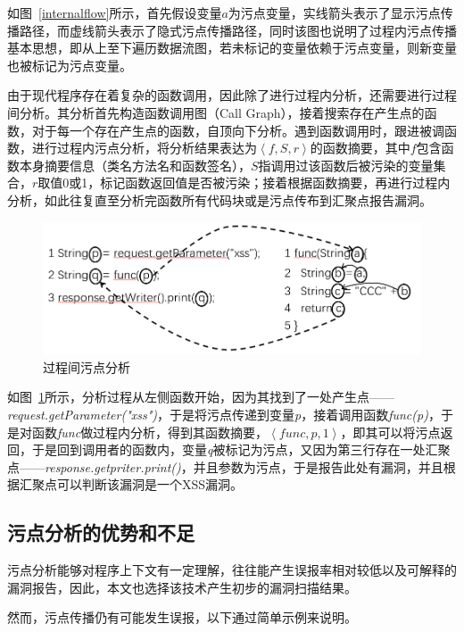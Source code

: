 如图~\ref{internalflow}所示，首先假设变量$a$为污点变量，实线箭头表示了显示污点传播路径，而虚线箭头表示了隐式污点传播路径，同时该图也说明了过程内污点传播基本思想，即从上至下遍历数据流图，若未标记的变量依赖于污点变量，则新变量也被标记为污点变量。

由于现代程序存在着复杂的函数调用，因此除了进行过程内分析，还需要进行过程间分析。其分析首先构造函数调用图（Call Graph），接着搜索存在产生点的函数，对于每一个存在产生点的函数，自顶向下分析。遇到函数调用时，跟进被调函数，进行过程内污点分析，将分析结果表达为$\left\langle f, S, r\right\rangle$的函数摘要，其中$f$包含函数本身摘要信息（类名方法名和函数签名），$S$指调用过该函数后被污染的变量集合，$r$取值0或1，标记函数返回值是否被污染；接着根据函数摘要，再进行过程内分析，如此往复直至分析完函数所有代码块或是污点传布到汇聚点报告漏洞。
\begin{figure}[htb]
	\centering
	\includegraphics[width=0.7\linewidth]{FIGs/chapter2/external_taintflow.png}
	\caption{过程间污点分析}\label{externalflow}
\end{figure}

如图~\ref{externalflow}所示，分析过程从左侧函数开始，因为其找到了一处产生点——\textit{request.getParameter("xss")}，于是将污点传递到变量\textit{p}，接着调用函数\textit{func(p)}，于是对函数\textit{func}做过程内分析，得到其函数摘要，$\left\langle func, p, 1\right\rangle$，即其可以将污点返回，于是回到调用者的函数内，变量\textit{q}被标记为污点，又因为第三行存在一处汇聚点——\textit{response.getpriter.print()}，并且参数为污点，于是报告此处有漏洞，并且根据汇聚点可以判断该漏洞是一个XSS漏洞。\\

\subsection{污点分析的优势和不足}
污点分析能够对程序上下文有一定理解，往往能产生误报率相对较低以及可解释的漏洞报告，因此，本文也选择该技术产生初步的漏洞扫描结果。

然而，污点传播仍有可能发生误报，以下通过简单示例来说明。

